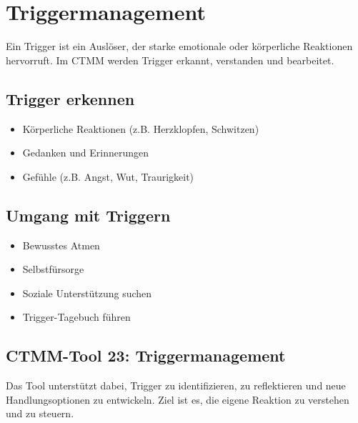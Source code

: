 \section{Triggermanagement}
\begin{tcolorbox}[colback=ctmmOrange!5!white,colframe=ctmmOrange,title=Was ist ein Trigger?]
Ein Trigger ist ein Auslöser, der starke emotionale oder körperliche Reaktionen hervorruft. Im CTMM werden Trigger erkannt, verstanden und bearbeitet.
\end{tcolorbox}

\subsection{Trigger erkennen}
\begin{itemize}
  \item Körperliche Reaktionen (z.B. Herzklopfen, Schwitzen)
  \item Gedanken und Erinnerungen
  \item Gefühle (z.B. Angst, Wut, Traurigkeit)
\end{itemize}

\subsection{Umgang mit Triggern}
\begin{tcolorbox}[colback=ctmmGreen!5!white,colframe=ctmmGreen,title=Strategien]
\begin{itemize}
  \item Bewusstes Atmen
  \item Selbstfürsorge
  \item Soziale Unterstützung suchen
  \item Trigger-Tagebuch führen
\end{itemize}
\end{tcolorbox}

\subsection{CTMM-Tool 23: Triggermanagement}
Das Tool unterstützt dabei, Trigger zu identifizieren, zu reflektieren und neue Handlungsoptionen zu entwickeln. Ziel ist es, die eigene Reaktion zu verstehen und zu steuern.
